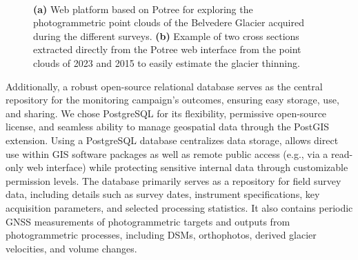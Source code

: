 \begin{figure}[p]
  \centering
     \\
    \caption{\textbf{(a)} Web platform based on Potree \citep{schutz2016potree} for exploring the photogrammetric point clouds of the Belvedere Glacier acquired during the different surveys. \textbf{(b)} Example of two cross sections extracted directly from the Potree web interface from the point clouds of 2023 and 2015 to easily estimate the glacier thinning.}
    \label{fig:3:potree}
\end{figure}

Additionally, a robust open-source relational database serves as the central repository for the monitoring campaign's outcomes, ensuring easy storage, use, and sharing. 
We chose PostgreSQL for its flexibility, permissive open-source license, and seamless ability to manage geospatial data through the PostGIS extension. 
Using a PostgreSQL database centralizes data storage, allows direct use within GIS software packages as well as remote public access (e.g., via a read-only web interface) while protecting sensitive internal data through customizable permission levels.
The database primarily serves as a repository for field survey data, including details such as survey dates, instrument specifications, key acquisition parameters, and selected processing statistics. 
It also contains periodic GNSS measurements of photogrammetric targets and outputs from photogrammetric processes, including DSMs, orthophotos, derived glacier velocities, and volume changes.

